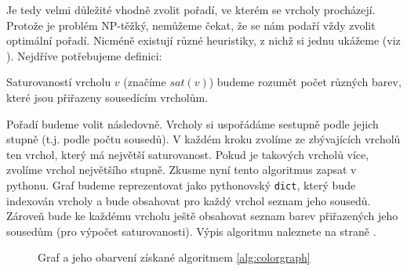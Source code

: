 Je tedy velmi důležité vhodně zvolit pořadí, ve kterém se vrcholy procházejí. Protože je problém NP-těžký, nemůžeme čekat, že
se nám podaří vždy zvolit optimální pořadí. Nicméně existují různé heuristiky, z nichž si jednu ukážeme (viz \cite{Brelaz:1979}).
Nejdříve potřebujeme definici:

\begin{definition} Saturovaností vrcholu $v$ (značíme $sat(v)$) budeme rozumět počet různých barev, které jsou přiřazeny
sousedícím vrcholům.
\end{definition}

Pořadí budeme volit následovně. Vrcholy si uspořádáme sestupně podle jejich stupně (t.j. podle počtu sousedů). V každém kroku
zvolíme ze zbývajících vrcholů ten vrchol, který má největší saturovanost. Pokud je takových vrcholů více, zvolíme vrchol
největšího stupně. Zkusme nyní tento algoritmus zapsat v pythonu. Graf budeme reprezentovat jako pythonovský {\tt dict}, který bude
indexován vrcholy a bude obsahovat pro každý vrchol seznam jeho sousedů. Zároveň bude ke každému vrcholu ještě obsahovat
seznam barev přiřazených jeho sousedům (pro výpočet saturovanosti).
Výpis algoritmu naleznete na straně \pageref{alg:colorgraph}.


\begin{figure}[p!]
\caption{Graf a jeho obarvení získané algoritmem \ref{alg:colorgraph}}
\end{figure}

